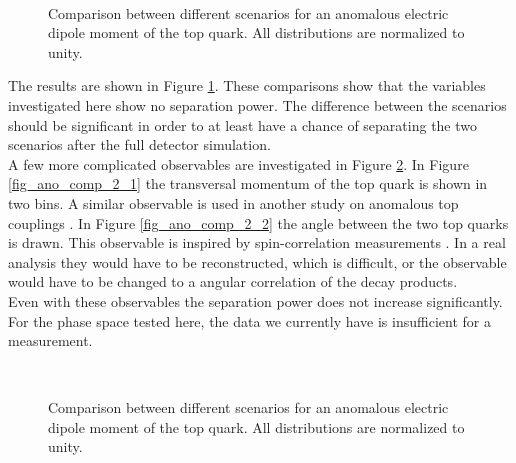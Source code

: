 \begin{figure}
\centering
  \\
  \caption{Comparison between different scenarios for an anomalous electric dipole moment of the top quark. All distributions are normalized to unity.}
  \label{fig_ano_comp_1}
\end{figure}

The results are shown in Figure \ref{fig_ano_comp_1}. These comparisons show that the variables investigated here show no separation power.  The difference between the scenarios should be significant in order to at least have a chance of separating the two scenarios after the full detector simulation.\\
A few more complicated observables are investigated in Figure \ref{fig_ano_comp_2}. In Figure \ref{fig_ano_comp_2_1} the transversal momentum of the top quark is shown in two bins. A similar observable is used in another study on anomalous top couplings . In Figure \ref{fig_ano_comp_2_2} the angle between the two top quarks is drawn. This observable is inspired by spin-correlation measurements \cite{CMS-PAS-TOP-12-004} \cite{Höhle:1349025}. In a real analysis they would have to be reconstructed, which is difficult, or the observable would have to be changed to a angular correlation of the decay products.\\
Even with these observables the separation power does not increase significantly. For the phase space tested here, the data we currently have is insufficient for a measurement.   

\begin{figure}
\centering
  \\
  \caption{Comparison between different scenarios for an anomalous electric dipole moment of the top quark. All distributions are normalized to unity.}
  \label{fig_ano_comp_2}
\end{figure}

